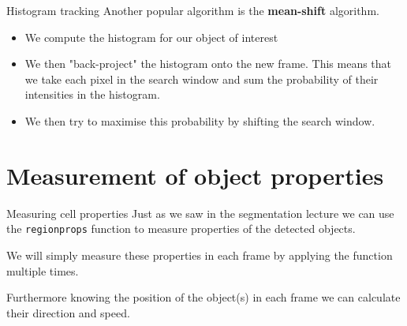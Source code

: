 \documentclass[9pt, aspectratio=169]{beamer}
\begin{document}
\begin{frame}
    {Histogram tracking}
    Another popular algorithm is the \textbf{mean-shift} algorithm.

    \begin{itemize}[<+->]
        \item We compute the histogram for our object of interest
        \item We then "back-project" the histogram onto the new frame. This means that we take each pixel in the search window and sum the probability of their intensities in the histogram.
        \item We then try to maximise this probability by shifting the search window. 
    \end{itemize}
\end{frame}
\section {Measurement of object properties}

\begin{frame}
    {Measuring cell properties}
    Just as we saw in the segmentation lecture we can use the \texttt{regionprops} function to measure properties of the detected objects.

    We will simply measure these properties in each frame by applying the function multiple times.
    
    Furthermore knowing the position of the object(s) in each frame we can calculate their direction and speed. 
\end{frame}
\end{document}

